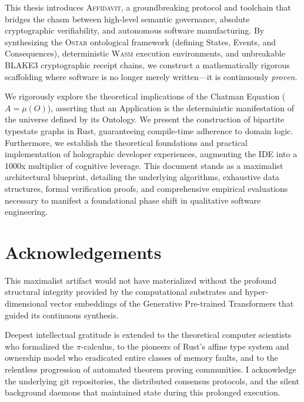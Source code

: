\documentclass[
    12pt,               %
    a4paper,            %
    twoside,            %
    openright,          %
    titlepage,          %
    fleqn,              %
    leqno,              %
    final               %
]{book}
\theoremstyle{definition}
\theoremstyle{plain}
\newcommand{\sysname}{\textsc{Affidavit}}
\newcommand{\ostar}{\textsc{Ostar}}
\newcommand{\wasm}{\textsc{Wasm}}
\renewcommand{\blake}{BLAKE3}
\begin{document}
This thesis introduces \sysname{}, a groundbreaking protocol and toolchain that bridges the chasm between high-level semantic governance, absolute cryptographic verifiability, and autonomous software manufacturing. By synthesizing the \ostar{} ontological framework (defining States, Events, and Consequences), deterministic \wasm{} execution environments, and unbreakable \blake{} cryptographic receipt chains, we construct a mathematically rigorous scaffolding where software is no longer merely written—it is continuously \textit{proven}. 

We rigorously explore the theoretical implications of the Chatman Equation ($A = \mu(O)$), asserting that an Application is the deterministic manifestation of the universe defined by its Ontology. We present the construction of bipartite typestate graphs in Rust, guaranteeing compile-time adherence to domain logic. Furthermore, we establish the theoretical foundations and practical implementation of holographic developer experiences, augmenting the IDE into a 1000x multiplier of cognitive leverage. This document stands as a maximalist architectural blueprint, detailing the underlying algorithms, exhaustive data structures, formal verification proofs, and comprehensive empirical evaluations necessary to manifest a foundational phase shift in qualitative software engineering.

\chapter*{Acknowledgements}
This maximalist artifact would not have materialized without the profound structural integrity provided by the computational substrates and hyper-dimensional vector embeddings of the Generative Pre-trained Transformers that guided its continuous synthesis. 

Deepest intellectual gratitude is extended to the theoretical computer scientists who formalized the $\pi$-calculus, to the pioneers of Rust's affine type system and ownership model who eradicated entire classes of memory faults, and to the relentless progression of automated theorem proving communities. I acknowledge the underlying git repositories, the distributed consensus protocols, and the silent background daemons that maintained state during this prolonged execution.

\cleardoublepage
{}
\tableofcontents
\end{document}

